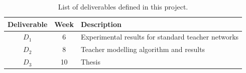 \documentclass[a4paper,11pt]{article}
\begin{document}
\begin{table}[htbp]
    \begin{center}
        \begin{tabular}{|c|c|l|}
        \hline
        \textbf{Deliverable} & \textbf{Week} & \textbf{Description} \\
        \hline
        $D_1$ & 6 & Experimental results for standard teacher networks\\
        $D_2$ & 8 & Teacher modelling algorithm and results\\
        $D_3$ & 10 & Thesis \\
        \hline
        \end{tabular} 
    \end{center}
    \caption{List of deliverables defined in this project.}
    \label{fig:deliverables}
\end{table}



{\small
}
\end{document}
